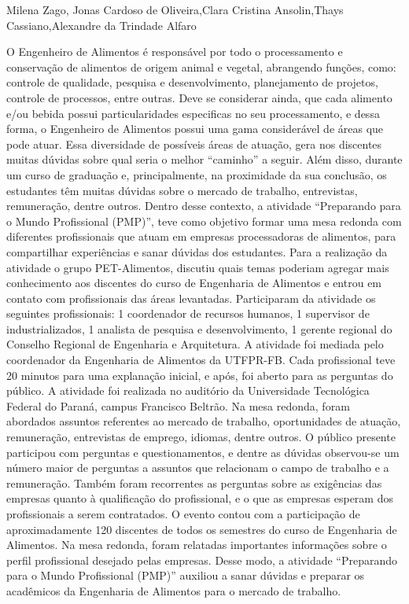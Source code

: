 Milena Zago, Jonas Cardoso de Oliveira,Clara Cristina Ansolin,Thays Cassiano,Alexandre da Trindade Alfaro

O Engenheiro de Alimentos é responsável por todo o processamento e conservação de alimentos 
de origem animal e vegetal, abrangendo funções, como: controle de qualidade, pesquisa e 
desenvolvimento, planejamento de projetos, controle de processos, entre outras. Deve se 
considerar ainda, que cada alimento e/ou bebida possui particularidades especificas no seu 
processamento, e dessa forma, o Engenheiro de Alimentos possui uma gama considerável de áreas 
que pode atuar. Essa diversidade de possíveis áreas de atuação, gera nos discentes muitas dúvidas 
sobre qual seria o melhor “caminho” a seguir. Além disso, durante um curso de graduação e, 
principalmente, na proximidade da sua conclusão, os estudantes têm muitas dúvidas sobre o 
mercado de trabalho, entrevistas, remuneração, dentre outros. Dentro desse contexto, a atividade 
“Preparando para o Mundo Profissional (PMP)”, teve como objetivo formar uma mesa redonda 
com diferentes profissionais que atuam em empresas processadoras de alimentos, para 
compartilhar experiências e sanar dúvidas dos estudantes. Para a realização da atividade o grupo 
PET-Alimentos, discutiu quais temas poderiam agregar mais conhecimento aos discentes do curso 
de Engenharia de Alimentos e entrou em contato com profissionais das áreas levantadas. 
Participaram da atividade os seguintes profissionais: 1 coordenador de recursos humanos, 1 
supervisor de industrializados, 1 analista de pesquisa e desenvolvimento, 1 gerente regional do 
Conselho Regional de Engenharia e Arquitetura. A atividade foi mediada pelo coordenador da 
Engenharia de Alimentos da UTFPR-FB. Cada profissional teve 20 minutos para uma explanação 
inicial, e após, foi aberto para as perguntas do público. A atividade foi realizada no auditório da 
Universidade Tecnológica Federal do Paraná, campus Francisco Beltrão. Na mesa redonda, foram 
abordados assuntos referentes ao mercado de trabalho, oportunidades de atuação, remuneração, 
entrevistas de emprego, idiomas, dentre outros. O público presente participou com perguntas e 
questionamentos, e dentre as dúvidas observou-se um número maior de perguntas a assuntos que 
relacionam o campo de trabalho e a remuneração. Também foram recorrentes as perguntas sobre 
as exigências das empresas quanto à qualificação do profissional, e o que as empresas esperam dos
profissionais a serem contratados. O evento contou com a participação de aproximadamente 120 
discentes de todos os semestres do curso de Engenharia de Alimentos. Na mesa redonda, foram 
relatadas importantes informações sobre o perfil profissional desejado pelas empresas. Desse 
modo, a atividade “Preparando para o Mundo Profissional (PMP)” auxiliou a sanar dúvidas e 
preparar os acadêmicos da Engenharia de Alimentos para o mercado de trabalho.

